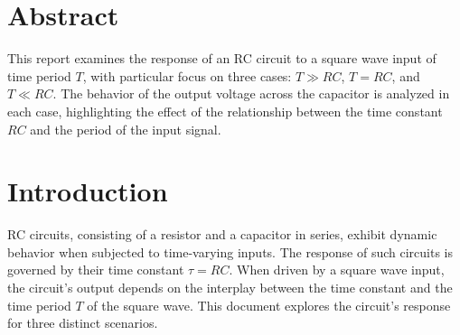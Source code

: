 \documentclass[12pt]{article}
\begin{document}


\vspace{3cm}

\section*{Abstract}
This report examines the response of an RC circuit to a square wave input of time period $T$, with particular focus on three cases: $T \gg RC$, $T = RC$, and $T \ll RC$. The behavior of the output voltage across the capacitor is analyzed in each case, highlighting the effect of the relationship between the time constant $RC$ and the period of the input signal.

\section{Introduction}
RC circuits, consisting of a resistor and a capacitor in series, exhibit dynamic behavior when subjected to time-varying inputs. The response of such circuits is governed by their time constant $\tau = RC$. When driven by a square wave input, the circuit's output depends on the interplay between the time constant and the time period $T$ of the square wave. This document explores the circuit's response for three distinct scenarios.
\end{document}
